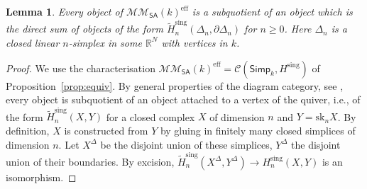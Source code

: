 \documentclass[11pt,a4paper]{amsart}
\newtheorem{lemma}{Lemma}[section]
\theoremstyle{definition}
\newcommand{\MMSA}{\mathcal{MM}_{\SA}}
\newcommand{\Ch}{\mathcal{C}}
\newcommand{\Xh}{\mathcal{X}}
\newcommand{\Xtilde}{\tilde{X}}
\newcommand{\Yh}{\mathcal{Y}}
\newcommand{\Ytilde}{\tilde{Y}}
\newcommand{\isom}{\cong}
\newcommand{\eff}{\mathrm{eff}}
\newcommand{\sa}{\mathrm{sa}}
\newcommand{\sk}{\mathrm{sk}}
\newcommand{\sing}{\mathrm{sing}}
\newcommand{\Hsing}{H^\sing}
\newcommand{\Hsingtilde}{\tilde{H}^\sing}
\newcommand{\SA}{\mathsf{SA}}
\newcommand{\Simp}{\mathsf{Simp}}
\newcommand{\R}{\mathbb{R}}
\newcommand{\A}{\mathbb{A}}
\begin{document}
\begin{lemma}
Every object of $\MMSA(k)^\eff$ is a subquotient of an object which is the direct sum of objects of the form $\Hsingtilde_n(\Delta_n,\partial \Delta_n)$ for $n\geq 0$. Here $\Delta_n$ is a closed linear $n$-simplex in some $\R^N$ with vertices in $k$.
\end{lemma}
\begin{proof}
We use the characterisation $\MMSA(k)^\eff=\Ch(\Simp_k,\Hsing)$ of Proposition~\ref{prop:equiv}. By general properties of the diagram category, see \cite[Propostition~7.1.16]{period-buch}, every object is subquotient of an object attached to a vertex of the quiver, i.e., of the
form $\Hsingtilde_n(X,Y)$ for a closed complex $X$ of dimension $n$ and $Y=\sk_n X$. By definition, $X$ is constructed from $Y$ by gluing in
finitely many closed simplices of dimension $n$. Let $X^\Delta$ be the disjoint union of these simplices, $Y^\Delta$ the disjoint union of their boundaries. By excision, $\Hsingtilde_n(X^\Delta,Y^\Delta)\to \Hsing_n(X,Y)$ is an isomorphism.
\end{proof}
\end{document}
